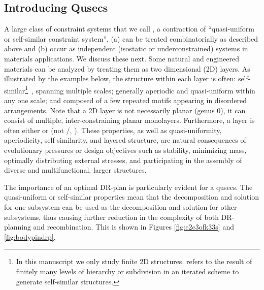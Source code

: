 \subsection{Introducing Qusecs}
A large class of constraint systems that we call , a contraction of ``quasi-uniform or self-similar constraint system'', (a) can be treated combinatorially as described above and (b) occur as independent (isostatic or underconstrained) systems in materials applications. We discuss these next.
%
Some natural and engineered materials can be analyzed by treating them as two dimensional (2D) layers. As illustrated by the examples below, the structure within each layer is often: self-similar\footnote{In this manuscript we only study finite 2D structures.  refers to the result of finitely many levels of hierarchy or subdivision in an iterated scheme to generate self-similar structures.}~\cite{2012arXiv1204.6389G}, spanning multiple scales; generally aperiodic and quasi-uniform within any one scale; and composed of a few repeated motifs appearing in disordered arrangements.
Note that a 2D layer is not necessarily planar (genus 0), it can consist of multiple, inter-constraining planar monolayers. Furthermore, a layer is often  either  or  (not /, \seedefsd).  These properties, as well as quasi-uniformity, aperiodicity, self-similarity, and layered structure, are natural consequences of evolutionary pressures or design objectives such as stability, minimizing mass, optimally distributing external stresses, and participating in the assembly of diverse and multifunctional, larger structures.
%

The importance of an optimal DR-plan is particularly evident for a qusecs. The quasi-uniform or self-similar properties mean that the decomposition and solution for one subsystem can be used as the decomposition and solution for other subsystems, thus causing further reduction in the complexity of both DR-planning and recombination. This is shown in Figures \ref{fig:c2c3ofk33s} and \ref{fig:bodypindrp}.




